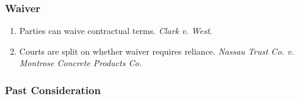 \subsubsection{Waiver}

\begin{enumerate}
    \item Parties can waive contractual terms. \emph{Clark v. West}.
    \item Courts are split on whether waiver requires reliance. \emph{Nassau 
    Trust Co. v. Montrose Concrete Products Co.}
\end{enumerate}

\subsubsection{Past Consideration}

